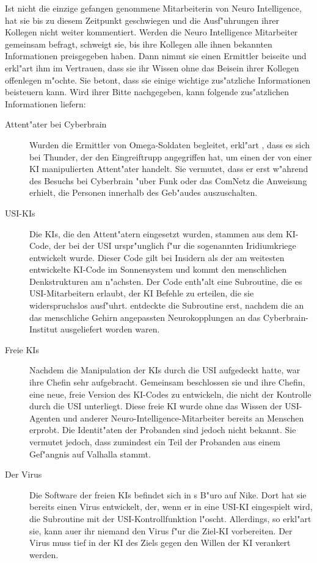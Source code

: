 Ist \ml{} nicht die einzige gefangen genommene Mitarbeiterin von Neuro Intelligence, hat sie bis zu diesem Zeitpunkt geschwiegen und die Ausf"uhrungen ihrer Kollegen nicht weiter kommentiert. Werden die Neuro Intelligence Mitarbeiter gemeinsam befragt, schweigt sie, bis ihre Kollegen alle ihnen bekannten Informationen preisgegeben haben. Dann nimmt sie einen Ermittler beiseite und erkl"art ihm im Vertrauen, dass sie ihr Wissen ohne das Beisein ihrer Kollegen offenlegen m"ochte. Sie betont, dass sie einige wichtige zus"atzliche Informationen beisteuern kann. Wird ihrer Bitte nachgegeben, kann \ml{} folgende zus"atzlichen Informationen liefern:

\begin{description}
	\item[Attent"ater bei Cyberbrain] Wurden die Ermittler von Omega-Soldaten begleitet, erkl"art \ml{}, dass es sich bei Thunder, der den 	
		Eingreiftrupp angegriffen hat, um einen der von einer KI manipulierten Attent"ater handelt. Sie vermutet, dass er erst w"ahrend des Besuchs bei Cyberbrain "uber Funk oder das ComNetz die Anweisung erhielt, die Personen innerhalb des Geb"audes auszuschalten.
    \item[USI-KIs] Die KIs, die den Attent"atern eingesetzt wurden, stammen aus dem KI-Code, der bei der USI urspr"unglich f"ur die 
		sogenannten Iridiumkriege entwickelt wurde. Dieser Code gilt bei Insidern als der am weitesten entwickelte KI-Code im Sonnensystem und kommt den menschlichen Denkstrukturen am n"achsten. Der Code enth"alt eine Subroutine, die es USI-Mitarbeitern erlaubt, der KI Befehle zu erteilen, die sie widerspruchslos ausf"uhrt. \ml{} entdeckte die Subroutine erst, nachdem die an das menschliche Gehirn angepassten Neurokopplungen an das Cyberbrain-Institut ausgeliefert worden waren.
	\item[Freie KIs] Nachdem \ml{} die Manipulation der KIs durch die USI aufgedeckt hatte, war ihre Chefin sehr aufgebracht. Gemeinsam 
		beschlossen sie und ihre Chefin, eine neue, freie Version des KI-Codes zu entwickeln, die nicht der Kontrolle durch die USI unterliegt. Diese freie KI wurde ohne das Wissen der USI-Agenten und anderer Neuro-Intelligence-Mitarbeiter bereits an Menschen erprobt. Die Identit"aten der Probanden sind \ml{} jedoch nicht bekannt. Sie vermutet jedoch, dass zumindest ein Teil der Probanden aus einem Gef"angnis auf Valhalla stammt.
	\item[Der Virus] Die Software der freien KIs befindet sich in \ml{}s B"uro auf Nike. Dort hat sie bereits einen Virus entwickelt, der, 
		wenn er in eine USI-KI eingespielt wird, die Subroutine mit der USI-Kontrollfunktion l"oscht. Allerdings, so erkl"art sie, kann au\3er ihr niemand den Virus f"ur die Ziel-KI vorbereiten. Der Virus muss tief in der KI des Ziels gegen den Willen der KI verankert werden.
\end{description}

